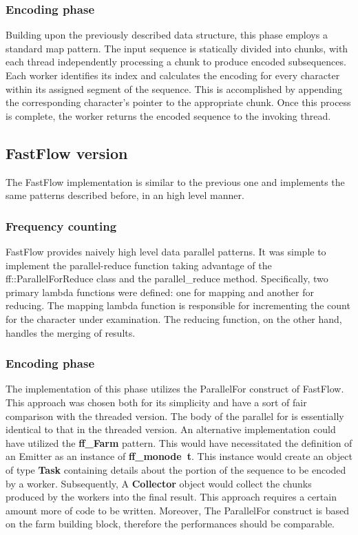 \documentclass{article}
\begin{document}
\subsubsection{Encoding phase}
Building upon the previously described data structure, this phase employs a standard map pattern.
The input sequence is statically divided into chunks, with each thread independently processing a
chunk to produce encoded subsequences.
Each worker identifies its index and calculates the encoding for every character within
its assigned segment of the sequence. This is accomplished by appending the corresponding
character's pointer to the appropriate chunk. Once this process is complete, the worker returns
the encoded sequence to the invoking thread.


\subsection{FastFlow version}
The FastFlow implementation is similar to the previous one and
implements the same patterns described before, in an high level manner.
\subsubsection{Frequency counting}
FastFlow provides naively high level data parallel patterns. It was simple
to implement the parallel-reduce function taking advantage of the ff::ParallelForReduce
class and the parallel\_reduce method.
Specifically, two primary lambda functions were defined: one for mapping and another for reducing.
The mapping lambda function is responsible for incrementing the count for the character under examination.
The reducing function, on the other hand, handles the merging of results.
\subsubsection{Encoding phase}
The implementation of this phase utilizes the ParallelFor construct of FastFlow.
This approach was chosen both for its simplicity and have a sort of fair comparison
with the threaded version. The body of the parallel for is essentially identical
to that in the threaded version.
An alternative implementation could have utilized the \textbf{ff\_Farm} pattern.
This would have necessitated the definition of an Emitter as an instance of \textbf{ff\_monode\ t}.
This instance would create an object of type \textbf{Task} containing details about the portion of the sequence to be
encoded by a worker. Subsequently, A \textbf{Collector} object would collect the chunks produced by the workers into the final result.
This approach requires a certain amount more of code to be written. Moreover, The ParallelFor
construct is based on the farm building block, therefore the performances should be comparable.
\end{document}

